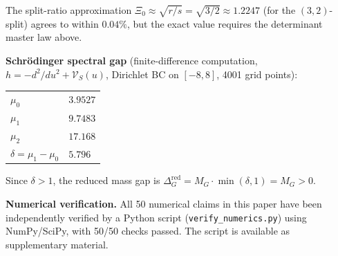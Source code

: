 \documentclass[12pt]{article}
\theoremstyle{plain}
\theoremstyle{definition}
\numberwithin{equation}{section}
\newcommand{\red}{\mathrm{red}}
\begin{document}
The split-ratio approximation $\Xi_0\approx\sqrt{r/s}=\sqrt{3/2}\approx1.2247$ (for the $(3,2)$-split) agrees to within $0.04\%$, but the exact value requires the determinant master law above.

\medskip

\noindent\textbf{Schr\"odinger spectral gap} (finite-difference computation, $h=-d^2/du^2+\mathcal{V}_S(u)$, Dirichlet BC on $[-8,8]$, 4001 grid points):
\begin{center}
\begin{tabular}{ll}
$\mu_0$ & $3.9527$\\
$\mu_1$ & $9.7483$\\
$\mu_2$ & $17.168$\\
$\delta=\mu_1-\mu_0$ & $5.796$\\
\end{tabular}
\end{center}
Since $\delta>1$, the reduced mass gap is $\Delta_G^{\red}=M_G\cdot\min(\delta,1)=M_G>0$.

\medskip

\noindent\textbf{Numerical verification.}  All 50 numerical claims in this paper have been independently verified by a Python script (\texttt{verify\_numerics.py}) using NumPy/SciPy, with 50/50 checks passed.  The script is available as supplementary material.
\end{document}
